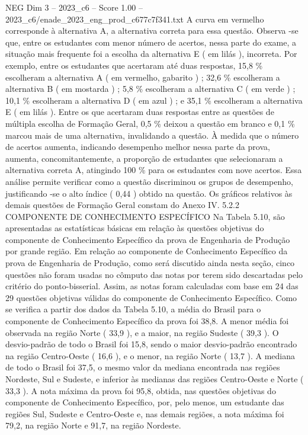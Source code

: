\begin{textsample}{NEG Dim 3 – 2023\_c6 – Score 1.00 – 2023\_c6/enade\_2023\_eng\_prod\_c677c7f341.txt}
A curva em vermelho corresponde à alternativa A, a alternativa correta para essa questão.
Observa -se que, entre os estudantes com menor número de acertos, nessa parte do exame, a situação mais frequente foi a escolha da alternativa E ( em lilás ), incorreta.
Por exemplo, entre os estudantes que acertaram até duas respostas, 15,8 \% escolheram a alternativa A ( em vermelho, gabarito ) ; 32,6 \% escolheram a alternativa B ( em mostarda ) ; 5,8 \% escolheram a alternativa C ( em verde ) ; 10,1 \% escolheram a alternativa D ( em azul ) ; e 35,1 \% escolheram a alternativa E ( em lilás ).
Entre os que acertaram duas respostas entre as questões de múltipla escolha de Formação Geral, 0,5 \% deixou a questão em branco e 0,1 \% marcou mais de uma alternativa, invalidando a questão.
À medida que o número de acertos aumenta, indicando desempenho melhor nessa parte da prova, aumenta, concomitantemente, a proporção de estudantes que selecionaram a alternativa correta A, atingindo 100 \% para os estudantes com nove acertos.
Essa análise permite verificar como a questão discriminou os grupos de desempenho, justificando -se o alto índice ( 0,44 ) obtido na questão.
Os gráficos relativos às demais questões de Formação Geral constam do Anexo IV. 5.2.2 COMPONENTE DE CONHECIMENTO ESPECÍFICO Na Tabela 5.10, são apresentadas as estatísticas básicas em relação às questões objetivas do componente de Conhecimento Específico da prova de Engenharia de Produção por grande região.
Em relação ao componente de Conhecimento Específico da prova de Engenharia de Produção, como será discutido ainda nesta seção, cinco questões não foram usadas no cômputo das notas por terem sido descartadas pelo critério do ponto-bisserial.
Assim, as notas foram calculadas com base em 24 das 29 questões objetivas válidas do componente de Conhecimento Específico.
Como se verifica a partir dos dados da Tabela 5.10, a média do Brasil para o componente de Conhecimento Específico da prova foi 38,8.
A menor média foi observada na região Norte ( 33,9 ), e a maior, na região Sudeste ( 39,3 ).
O desvio-padrão de todo o Brasil foi 15,8, sendo o maior desvio-padrão encontrado na região Centro-Oeste ( 16,6 ), e o menor, na região Norte ( 13,7 ).
A mediana de todo o Brasil foi 37,5, o mesmo valor da mediana encontrada nas regiões Nordeste, Sul e Sudeste, e inferior às medianas das regiões Centro-Oeste e Norte ( 33,3 ).
A nota máxima da prova foi 95,8, obtida, nas questões objetivas do componente de Conhecimento Específico, por, pelo menos, um estudante das regiões Sul, Sudeste e Centro-Oeste e, nas demais regiões, a nota máxima foi 79,2, na região Norte e 91,7, na região Nordeste.

\end{textsample}
